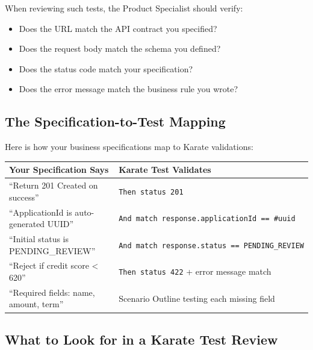 \documentclass[
  11pt,
  openany,
  oneside]{book}
\providecommand{\tightlist}{%
  \setlength{\itemsep}{0pt}\setlength{\parskip}{0pt}}
\begin{document}
When reviewing such tests, the Product Specialist should verify:

\begin{itemize}
\tightlist
\item
  Does the URL match the API contract you specified?
\item
  Does the request body match the schema you defined?
\item
  Does the status code match your specification?
\item
  Does the error message match the business rule you wrote?
\end{itemize}

\subsection{The Specification-to-Test
Mapping}\label{the-specification-to-test-mapping}

Here is how your business specifications map to Karate validations:

\begin{longtable}[]{@{}
  >{\raggedright\arraybackslash}p{}
  >{\raggedright\arraybackslash}p{}@{}}
\toprule\noalign{}
\begin{minipage}[b]{\linewidth}\raggedright
Your Specification Says
\end{minipage} & \begin{minipage}[b]{\linewidth}\raggedright
Karate Test Validates
\end{minipage} \\
\midrule\noalign{}
\endhead
\bottomrule\noalign{}
\endlastfoot
``Return 201 Created on success'' & \texttt{Then\ status\ 201} \\
``ApplicationId is auto-generated UUID'' &
\texttt{And\ match\ response.applicationId\ ==\ \textquotesingle{}\#uuid\textquotesingle{}} \\
``Initial status is PENDING\_REVIEW'' &
\texttt{And\ match\ response.status\ ==\ \textquotesingle{}PENDING\_REVIEW\textquotesingle{}} \\
``Reject if credit score \textless{} 620'' & \texttt{Then\ status\ 422}
+ error message match \\
``Required fields: name, amount, term'' & Scenario Outline testing each
missing field \\
\end{longtable}

\subsection{What to Look for in a Karate Test
Review}\label{what-to-look-for-in-a-karate-test-review}
\end{document}
